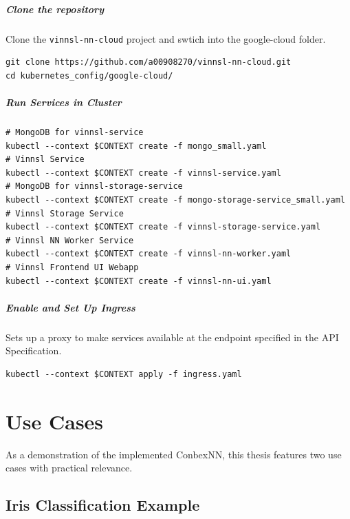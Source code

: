\paragraph{Clone the repository}\label{clone-the-repository}

Clone the \texttt{vinnsl-nn-cloud} project and swtich into the
google-cloud folder.

\begin{verbatim}
git clone https://github.com/a00908270/vinnsl-nn-cloud.git
cd kubernetes_config/google-cloud/
\end{verbatim}

\paragraph{Run Services in Cluster}\label{run-services-in-cluster-1}

\begin{verbatim}
# MongoDB for vinnsl-service
kubectl --context $CONTEXT create -f mongo_small.yaml 
# Vinnsl Service
kubectl --context $CONTEXT create -f vinnsl-service.yaml
# MongoDB for vinnsl-storage-service
kubectl --context $CONTEXT create -f mongo-storage-service_small.yaml
# Vinnsl Storage Service
kubectl --context $CONTEXT create -f vinnsl-storage-service.yaml
# Vinnsl NN Worker Service
kubectl --context $CONTEXT create -f vinnsl-nn-worker.yaml
# Vinnsl Frontend UI Webapp
kubectl --context $CONTEXT create -f vinnsl-nn-ui.yaml
\end{verbatim}

\paragraph{Enable and Set Up Ingress}\label{enable-and-set-up-ingress-1}

Sets up a proxy to make services available at the endpoint specified in
the API Specification.

\begin{verbatim}
kubectl --context $CONTEXT apply -f ingress.yaml
\end{verbatim}

\chapter{Use Cases}\label{use-cases}

As a demonstration of the implemented ConbexNN, this thesis features two
use cases with practical relevance.

\section{Iris Classification Example}\label{iris-classification-example}

